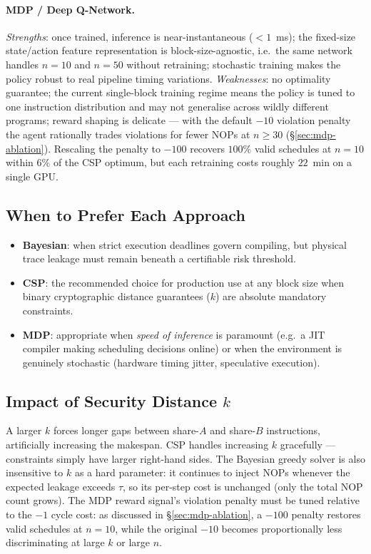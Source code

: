 \documentclass[letterpaper]{article}
\begin{document}
\paragraph{MDP / Deep Q-Network.}
\textit{Strengths}: once trained, inference is near-instantaneous
($< 1$~ms); the fixed-size state/action feature representation is
block-size-agnostic, i.e.\ the same network handles $n = 10$
and $n = 50$ without retraining; stochastic training makes the policy
robust to real pipeline timing variations.
\textit{Weaknesses}: no optimality guarantee; the current single-block
training regime means the policy is tuned to one instruction distribution
and may not generalise across wildly different programs; reward shaping
is delicate --- with the default $-10$ violation penalty the agent
rationally trades violations for fewer NOPs at $n \ge 30$
(\S\ref{sec:mdp-ablation}). Rescaling the penalty to $-100$ recovers
$100\%$ valid schedules at $n=10$ within $6\%$ of the CSP optimum,
but each retraining costs roughly $22$~min on a single GPU.

\subsection{When to Prefer Each Approach}

\begin{itemize}\setlength\itemsep{2pt}
  \item \textbf{Bayesian}: when strict execution deadlines govern compiling, but physical trace leakage must remain beneath a certifiable risk threshold.
  \item \textbf{CSP}: the recommended choice for production use at any
        block size when binary cryptographic distance guarantees ($k$) are absolute mandatory constraints.
  \item \textbf{MDP}: appropriate when \emph{speed of inference} is
        paramount (e.g.\ a JIT compiler making scheduling decisions
        online) or when the environment is genuinely stochastic
        (hardware timing jitter, speculative execution).
\end{itemize}

\subsection{Impact of Security Distance $k$}

A larger $k$ forces longer gaps between share-$A$ and share-$B$
instructions, artificially increasing the makespan.  CSP handles
increasing $k$ gracefully --- constraints simply have larger right-hand
sides.  The Bayesian greedy solver is also insensitive to $k$ as a hard
parameter: it continues to inject NOPs whenever the expected leakage
exceeds $\tau$, so its per-step cost is unchanged (only the total NOP
count grows).  The MDP reward signal's violation penalty must be tuned
relative to the $-1$ cycle cost: as discussed in
\S\ref{sec:mdp-ablation}, a $-100$ penalty restores valid schedules
at $n=10$, while the original $-10$ becomes proportionally less
discriminating at large $k$ or large $n$.
\end{document}
